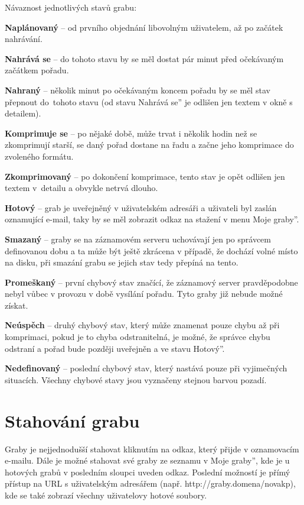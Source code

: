 Návaznost jednotlivých stavů grabu:
\bitem
\item\textbf{Naplánovaný} -- od prvního objednání libovolným uživatelem, až po začátek nahrávání.
\item\textbf{Nahrává se} -- do tohoto stavu by se měl dostat pár minut před očekávaným začátkem pořadu.
\item\textbf{Nahraný} -- několik minut po očekávaným koncem pořadu by se měl stav přepnout do~tohoto stavu (od stavu \quotedblbase Nahrává se'' je odlišen jen textem v okně s detailem).
\item\textbf{Komprimuje se} -- po nějaké době, může trvat i několik hodin než se zkomprimují starší, se daný pořad dostane na řadu a začne jeho komprimace do zvoleného formátu.
\item\textbf{Zkomprimovaný} -- po dokončení komprimace, tento stav je opět odlišen jen textem v~detailu a obvykle netrvá dlouho.
\item\textbf{Hotový} -- grab je uveřejněný v uživatelském adresáři a uživateli byl zaslán oznamující e-mail, taky by se měl zobrazit odkaz na stažení v menu \quotedblbase Moje graby''.
\item\textbf{Smazaný} -- graby se na záznamovém serveru uchovávají jen po správcem definovanou dobu a ta může být ještě zkrácena v případě, že dochází volné místo na disku, při smazání grabu se jejich stav tedy přepíná na tento.
\item\textbf{Promeškaný} -- první chybový stav značící, že záznamový server pravděpodobne nebyl vůbec v provozu v době vysílání pořadu. Tyto graby již nebude možné získat.
\item\textbf{Neúspěch} -- druhý chybový stav, který může znamenat pouze chybu až při komprimaci, pokud je to chyba odstranitelná, je možné, že správce chybu odstraní a pořad bude později uveřejněn a ve stavu \quotedblbase Hotový''.
\item\textbf{Nedefinovaný} -- poslední chybový stav, který nastává pouze při vyjimečných situacích. Všechny chybové stavy jsou vyznačeny stejnou barvou pozadí.
\eitem

\section{Stahování grabu}
Graby je nejjednodušší stahovat kliknutím na odkaz, který přijde v oznamovacím e-mailu. Dále je možné stahovat své graby ze seznamu v \quotedblbase Moje graby'', kde je u hotových grabů v posledním sloupci uveden odkaz. Poslední možností je přímý přístup na URL s uživatelským adresářem (např. http://graby.domena/novakp), kde se také zobrazí všechny uživatelovy hotové soubory.

